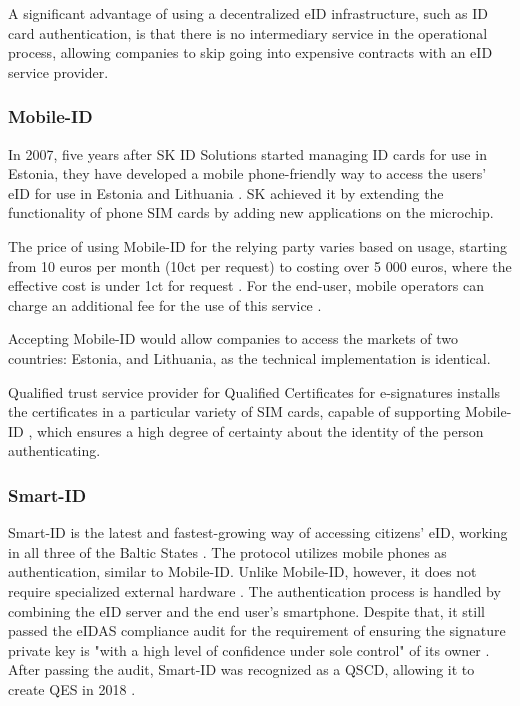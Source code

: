 A significant advantage of using a decentralized eID infrastructure, such as ID card authentication, is that there is no intermediary service in the operational process, allowing companies to skip going into expensive contracts with an eID service provider.

\subsubsection{Mobile-ID}

In 2007, five years after SK ID Solutions started managing ID cards for use in Estonia, they have developed a mobile phone-friendly way to access the users' eID for use in Estonia and Lithuania \cite{sk-history2007}. SK achieved it by extending the functionality of phone SIM cards by adding new applications on the microchip.

The price of using Mobile-ID for the relying party varies based on usage, starting from 10 euros per month (10ct per request) to costing over 5 000 euros, where the effective cost is under 1ct for request \cite{sk-mobileidpricing}. For the end-user, mobile operators can charge an additional fee for the use of this service \cite{telia-mobileid}.

Accepting Mobile-ID would allow companies to access the markets of two countries: Estonia, and Lithuania, as the technical implementation is identical.

Qualified trust service provider for Qualified Certificates for e-signatures installs the certificates in a particular variety of SIM cards, capable of supporting Mobile-ID \cite{eu-trustservices}, which ensures a high degree of certainty about the identity of the person authenticating.

\subsubsection{Smart-ID}

Smart-ID is the latest and fastest-growing way of accessing citizens' eID, working in all three of the Baltic States \cite{sk-history2017}. The protocol utilizes mobile phones as authentication, similar to Mobile-ID. Unlike Mobile-ID, however, it does not require specialized external hardware \cite{smartid-docs}. The authentication process is handled by combining the eID server and the end user's smartphone. Despite that, it still passed the eIDAS compliance audit for the requirement of ensuring the signature private key is "with a high level of confidence under sole control" of its owner \cite{enisa-eidasreq}. After passing the audit, Smart-ID was recognized as a QSCD, allowing it to create QES in 2018 \cite{smartid-qscd}.

